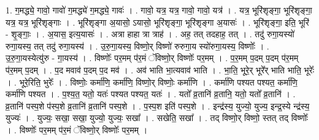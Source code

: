 \documentclass[17pt]{extarticle}
\begin{document}
1. ग॒मद्ध्ये॒ गावो॒ गावो॑ ग॒मद्ध्ये॑ ग॒मद्ध्ये॒ गावः॑ । . गावो॒ यत्र॒ यत्र॒ गावो॒ गावो॒ यत्र॑ । . यत्र॒ भूरि॑शृङ्गा॒ भूरि॑शृङ्गा॒ यत्र॒ यत्र॒ भूरि॑शृङ्गाः । . भूरि॑शृङ्गा अ॒यासो॒ ऽयासो॒ भूरि॑शृङ्गा॒ भूरि॑शृङ्गा अ॒यासः॑ । . भूरि॑शृङ्गा॒ इति॒ भूरि॑ - शृ॒ङ्गाः॒ । . अ॒यास॒ इत्य॒यासः॑ । . अत्रा हाहा त्रा त्राह॑ । . अह॒ तत् तदहाह॒ तत् । . तदु॑ रुगा॒यस्यो॑ रुगा॒यस्य॒ तत् तदु॑ रुगा॒यस्य॑ । . उ॒रु॒गा॒यस्य॒ विष्णो॒र् विष्णो॑ रुरुगा॒य स्यो॑रुगा॒यस्य॒ विष्णोः᳚ । . उ॒रु॒गा॒यस्येत्यु॑रु - गा॒यस्य॑ । . विष्णोः᳚ पर॒मम् प॑र॒मं ॅविष्णो॒र् विष्णोः᳚ पर॒मम् । . प॒र॒मम् प॒दम् प॒दम् प॑र॒मम् प॑र॒मम् प॒दम् । . प॒द मवाव॑ प॒दम् प॒द मव॑ । . अव॑ भाति भा॒त्यवाव॑ भाति । . भा॒ति॒ भूरे॒र् भूरे᳚र् भाति भाति॒ भूरेः᳚ । . भूरे॒रिति॒ भुरेः᳚ । . विष्णोः॒ कर्मा॑णि॒ कर्मा॑णि॒ विष्णो॒र् विष्णोः॒ कर्मा॑णि । . कर्मा॑णि पश्यत पश्यत॒ कर्मा॑णि॒ कर्मा॑णि पश्यत । . प॒श्य॒त॒ यतो॒ यतः॑ पश्यत पश्यत॒ यतः॑ । . यतो᳚ व्र॒तानि॑ व्र॒तानि॒ यतो॒ यतो᳚ व्र॒तानि॑ । . व्र॒तानि॑ पस्प॒शे प॑स्प॒शे व्र॒तानि॑ व्र॒तानि॑ पस्प॒शे । . प॒स्प॒श इति॑ पस्प॒शे । . इन्द्र॑स्य॒ युज्यो॒ युज्य॒ इन्द्र॒स्ये न्द्र॑स्य॒ युज्यः॑ । . युज्यः॒ सखा॒ सखा॒ युज्यो॒ युज्यः॒ सखा᳚ । . सखेति॒ सखा᳚ । . तद् विष्णो॒र् विष्णो॒ स्तत् तद् विष्णोः᳚ । . विष्णोः᳚ पर॒मम् प॑र॒मं ॅविष्णो॒र् विष्णोः᳚ पर॒मम् । \newline
\end{document}
